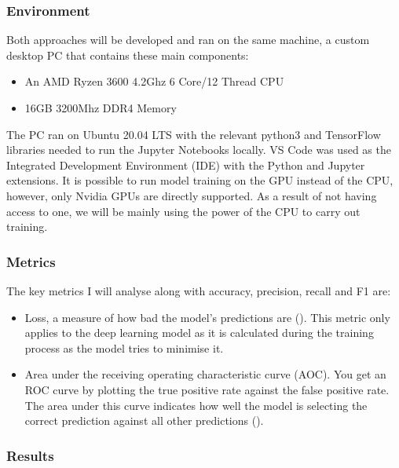 \documentclass{article}
\begin{document}
\subsubsection{Environment}

\label{subsec:env}

Both approaches will be developed and ran on the same machine, a custom desktop PC that contains these main components: 

\begin{itemize}
    \item An AMD Ryzen 3600 4.2Ghz 6 Core/12 Thread CPU
    \item 16GB 3200Mhz DDR4 Memory
\end{itemize}

The PC ran on Ubuntu 20.04 LTS with the relevant python3 and TensorFlow libraries needed to run the Jupyter Notebooks 
locally. VS Code was used as the Integrated Development Environment (IDE) with the Python and Jupyter extensions.  It is
possible to run model training on the GPU instead of the CPU, however, only Nvidia GPUs are directly supported. As a 
result of not having access to one, we will be mainly using the power of the CPU to carry out training.

\subsubsection{Metrics}

The key metrics I will analyse along with accuracy, precision, recall and F1 are: 

\begin{itemize}
    \item Loss, a measure of how bad the model's predictions are (\cite{googletrainloss}). 
    This metric only applies to the deep learning model as it is calculated during the training process as the model 
    tries to minimise it.
    \item Area under the receiving operating characteristic curve (AOC). You get an ROC curve by plotting the true 
    positive rate against the false positive rate. The area under this curve indicates how well the model is selecting 
    the correct prediction against all other predictions (\cite{googleroc}).
\end{itemize}

\subsubsection{Results}
\end{document}
